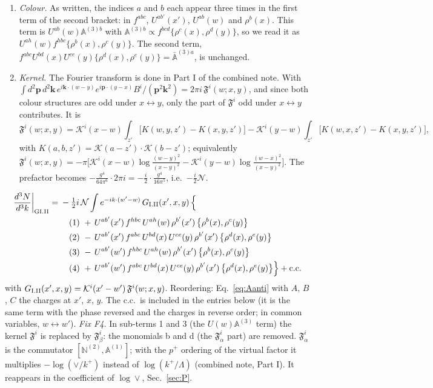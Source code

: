 \documentclass[10pt]{article}
\numberwithin{equation}{section}
\newcommand{\KK}{\mathcal K}
\newcommand{\NN}{\mathcal N}
\begin{document}
\begin{enumerate}
\item \emph{Colour.} As written, the indices $a$ and $b$ each appear three times in the first term of the second bracket: in $f^{abc}$, $U^{ab'}(x')$, $U^{ab}(w)$ and $\rho^b(x)$. This term is $U^{ab}(w)\mathbb A^{(3)b}$ with $\mathbb A^{(3)b}\propto f^{bcd}\{\rho^c(x),\rho^d(y)\}$, so we read it as $U^{ah}(w)f^{hbc}\{\rho^b(x),\rho^c(y)\}$. The second term, $f^{abc}U^{bd}(x)U^{ce}(y)\{\rho^d(x),\rho^e(y)\}=\bar{\mathbb A}^{(3)a}$, is unchanged.
\item \emph{Kernel.} The Fourier transform is done in Part I of the combined note. With $\int d^2\mathbf p\,d^2\mathbf k\,e^{i\mathbf k\cdot(w-y)}e^{i\mathbf p\cdot(y-x)}B^i/(\mathbf p^2\mathbf k^2)=2\pi i\,\mathfrak F^i(w;x,y)$, and since both colour structures are odd under $x\leftrightarrow y$, only the part of $\mathfrak F^i$ odd under $x\leftrightarrow y$ contributes. It is
\begin{equation*}
\mathfrak F^i(w;x,y)=\KK^i(x-w)\int_{z'}\big[K(w,y,z')-K(x,y,z')\big]-\KK^i(y-w)\int_{z'}\big[K(w,x,z')-K(x,y,z')\big],
\end{equation*}
with $K(a,b,z')=\KK(a-z')\cdot\KK(b-z')$; equivalently $\mathfrak F^i(w;x,y)=-\pi\big[\KK^i(x-w)\log\frac{(w-y)^2}{(x-y)^2}-\KK^i(y-w)\log\frac{(w-x)^2}{(x-y)^2}\big]$. The prefactor becomes $-\frac{g^4}{64\pi^6}\cdot2\pi i=-\frac{i}{2}\cdot\frac{g^4}{16\pi^5}$, i.e.\ $-\frac i2\NN$.
\end{enumerate}
\begin{align}
\frac{d^3N}{d^3k}\bigg|_{\rm GI.II}={}&-\tfrac12i\,\NN\int e^{-ik\cdot(w'-w)}\,G_{\rm I.II}(x',x,y)\,\Big\{\notag\\
&\quad (1)\ +\,U^{ab'}(x')\,f^{hbc}\,U^{ah}(w)\,\rho^{b'}(x')\,\big\{\rho^{b}(x),\rho^{c}(y)\big\}\notag\\
&\quad (2)\ -\,U^{ab'}(x')\,f^{abc}\,U^{bd}(x)\,U^{ce}(y)\,\rho^{b'}(x')\,\big\{\rho^{d}(x),\rho^{e}(y)\big\}\notag\\
&\quad (3)\ -\,U^{ab'}(w')\,f^{hbc}\,U^{ah}(w)\,\rho^{b'}(x')\,\big\{\rho^{b}(x),\rho^{c}(y)\big\}\notag\\
&\quad (4)\ +\,U^{ab'}(w')\,f^{abc}\,U^{bd}(x)\,U^{ce}(y)\,\rho^{b'}(x')\,\big\{\rho^{d}(x),\rho^{e}(y)\big\}\Big\}+{\rm c.c.}\label{eq:in-GI.II}
\end{align}
with $G_{\rm I.II}(x',x,y)=\KK^{i}(x'-w')\,\mathfrak F^{i}(w;x,y)$.
Reordering: Eq.~\eqref{eq:Aanti} with $A$, $B$, $C$ the charges at $x'$, $x$, $y$.
The c.c.\ is included in the entries below (it is the same term with the phase reversed and the charges in reverse order; in common variables, $w\leftrightarrow w'$).
\emph{Fix F4.} In sub-terms 1 and 3 (the $U(w)\mathbb A^{(3)}$ term) the kernel $\mathfrak F^i$ is replaced by $\mathfrak F^i_\beta$: the monomials b and d (the $\mathfrak F^i_\alpha$ part) are removed. $\mathfrak F^i_\alpha$ is the commutator $[\mathbb N^{(2)},\mathbb A^{(1)}]$; with the $p^+$ ordering of the virtual factor it multiplies $-\log(\vee/k^+)$ instead of $\log(k^+/\Lambda)$ (combined note, Part I). It reappears in the coefficient of $\log\vee$, Sec.~\ref{sec:P}.
\end{document}
